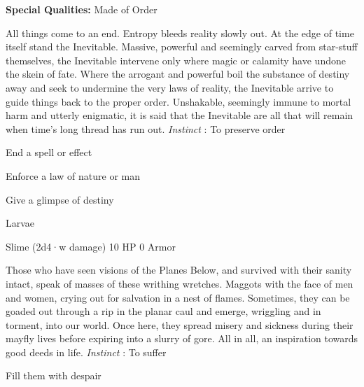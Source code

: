 
       
\startMonsterQualities
         {\bf Special Qualities:}  Made of Order
\stopMonsterQualities
       
\startMonsterDescription
All things come to an end. Entropy bleeds reality slowly out. At the edge of time itself stand the Inevitable. Massive, powerful and seemingly carved from star-stuff themselves, the Inevitable intervene only where magic or calamity have undone the skein of fate. Where the arrogant and powerful boil the substance of destiny away and seek to undermine the very laws of reality, the Inevitable arrive to guide things back to the proper order. Unshakable, seemingly immune to mortal harm and utterly enigmatic, it is said that the Inevitable are all that will remain when time’s long thread has run out. {\em Instinct} : To preserve order
\stopMonsterDescription
       
\startitemize[1,packed]
         
\item End a spell or effect

         
\item Enforce a law of nature or man

         
\item Give a glimpse of destiny

       
\stopitemize
       
\startMonsterName
Larvae	 
\stopMonsterName
       

Slime (2d4·w damage)	10 HP	0 Armor

       


       
\startMonsterDescription
Those who have seen visions of the Planes Below, and survived with their sanity intact, speak of masses of these writhing wretches. Maggots with the face of men and women, crying out for salvation in a nest of flames. Sometimes, they can be goaded out through a rip in the planar caul and emerge, wriggling and in torment, into our world. Once here, they spread misery and sickness during their mayfly lives before expiring into a slurry of gore. All in all, an inspiration towards good deeds in life. {\em Instinct} : To suffer
\stopMonsterDescription
       
\startitemize[1,packed]
         
\item Fill them with despair

